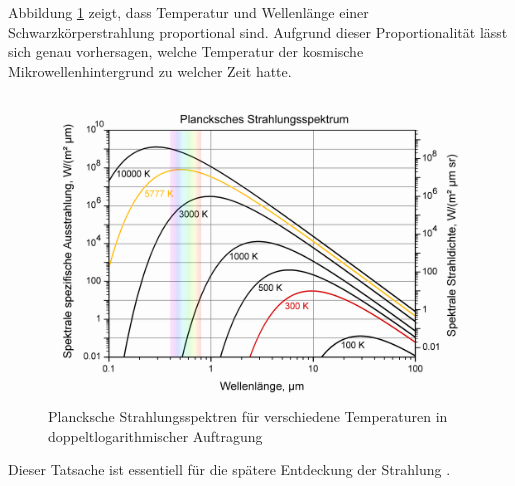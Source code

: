 Abbildung \ref{fig:blackbody_spectrum} zeigt, dass Temperatur und Wellenlänge einer Schwarzkörperstrahlung proportional sind.
Aufgrund dieser Proportionalität lässt sich genau vorhersagen, welche Temperatur der kosmische Mikrowellenhintergrund zu welcher Zeit hatte.
\begin{figure}
	\centering
	\includegraphics[width=0.7\linewidth]{cmb/images/blackbody_spectrum.png}
	\caption{Plancksche Strahlungsspektren für verschiedene Temperaturen in doppeltlogarithmischer Auftragung}
	\label{fig:blackbody_spectrum}
\end{figure}
Dieser Tatsache ist essentiell für die spätere Entdeckung der Strahlung
\cite{cmb:intro}.
